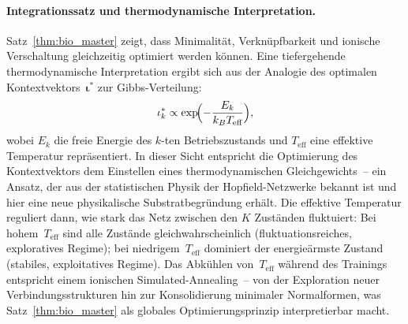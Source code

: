 \documentclass[12pt, a4paper, openany]{report}
\begin{document}
\paragraph{Integrationssatz und thermodynamische Interpretation.}
Satz~\ref{thm:bio_master} zeigt, dass Minimalität, Verknüpfbarkeit und
ionische Verschaltung gleichzeitig optimiert werden können.  Eine
tiefergehende thermodynamische Interpretation ergibt sich aus der Analogie
des optimalen Kontextvektors~$\bm{\iota}^*$ zur Gibbs-Verteilung:
\[
  \iota_k^* \propto \exp\!\Bigl(-\frac{E_k}{k_B T_{\text{eff}}}\Bigr),
\]
wobei $E_k$ die freie Energie des $k$-ten Betriebszustands und
$T_{\text{eff}}$ eine effektive Temperatur repräsentiert.  In dieser Sicht
entspricht die Optimierung des Kontextvektors dem Einstellen eines
thermodynamischen Gleichgewichts~-- ein Ansatz, der aus der statistischen
Physik der Hopfield-Netzwerke \cite{goodfellow16} bekannt ist und
hier eine neue physikalische Substratbegründung erhält.
Die effektive Temperatur reguliert dann, wie stark das Netz zwischen den
$K$ Zuständen fluktuiert: Bei hohem~$T_{\text{eff}}$ sind alle Zustände
gleichwahrscheinlich (fluktuationsreiches, exploratives Regime); bei
niedrigem~$T_{\text{eff}}$ dominiert der energieärmste Zustand (stabiles,
exploitatives Regime).  Das Abkühlen von~$T_{\text{eff}}$ während des
Trainings entspricht einem ionischen Simulated-Annealing~-- von der Exploration
neuer Verbindungsstrukturen hin zur Konsolidierung minimaler Normalformen, was
Satz~\ref{thm:bio_master} als globales Optimierungsprinzip interpretierbar macht.
\end{document}
